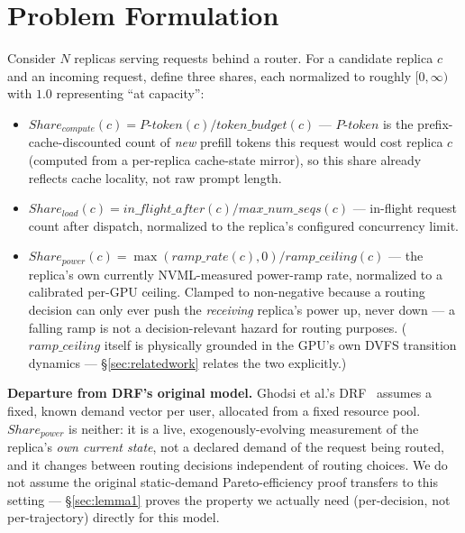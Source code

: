 \documentclass[sigconf,review,anonymous]{acmart}
\begin{document}
\section{Problem Formulation}
\label{sec:formulation}

Consider $N$ replicas serving requests behind a router. For a candidate replica $c$ and an
incoming request, define three shares, each normalized to roughly $[0,\infty)$ with $1.0$
representing ``at capacity'':

\begin{itemize}
  \item $\mathit{Share_{compute}}(c) = \mathit{P\text{-}token}(c) / \mathit{token\_budget}(c)$
    --- $\mathit{P\text{-}token}$ is the prefix-cache-discounted count of \emph{new} prefill
    tokens this request would cost replica $c$ (computed from a per-replica cache-state
    mirror), so this share already reflects cache locality, not raw prompt length.
  \item $\mathit{Share_{load}}(c) = \mathit{in\_flight\_after}(c) / \mathit{max\_num\_seqs}(c)$
    --- in-flight request count after dispatch, normalized to the replica's configured
    concurrency limit.
  \item $\mathit{Share_{power}}(c) = \max(\mathit{ramp\_rate}(c), 0) / \mathit{ramp\_ceiling}(c)$
    --- the replica's own currently NVML-measured power-ramp rate, normalized to a calibrated
    per-GPU ceiling. Clamped to non-negative because a routing decision can only ever push
    the \emph{receiving} replica's power up, never down --- a falling ramp is not a
    decision-relevant hazard for routing purposes. ($\mathit{ramp\_ceiling}$ itself is
    physically grounded in the GPU's own DVFS transition dynamics --- \S\ref{sec:relatedwork}
    relates the two explicitly.)
\end{itemize}

\textbf{Departure from DRF's original model.} Ghodsi et al.'s DRF~\cite{ghodsi2011drf}
assumes a fixed, known demand vector per user, allocated from a fixed resource pool.
$\mathit{Share_{power}}$ is neither: it is a live, exogenously-evolving measurement of the
replica's \emph{own current state}, not a declared demand of the request being routed, and it
changes between routing decisions independent of routing choices. We do not assume the
original static-demand Pareto-efficiency proof transfers to this setting --- \S\ref{sec:lemma1}
proves the property we actually need (per-decision, not per-trajectory) directly for this
model.
\end{document}
